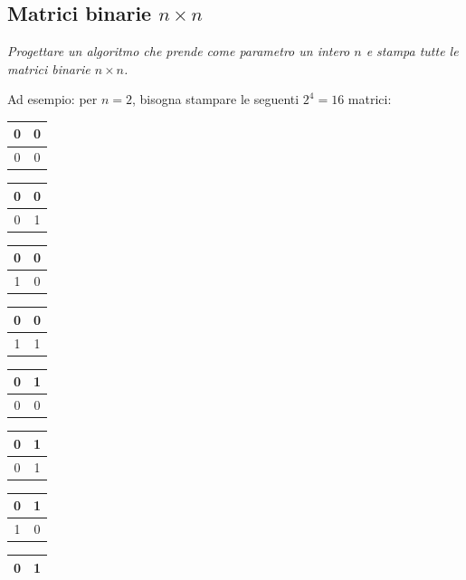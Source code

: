 \subsection{Matrici binarie $n\times n$}
\textit{Progettare un algoritmo che prende come parametro un intero $n$ e stampa tutte le matrici binarie $n\times n$.}

Ad esempio: per $n = 2$, bisogna stampare le seguenti $2^4 = 16$ matrici:
\begin{center}
\begin{tabular}{|c|c|}\hline
     0&0\\\hline
     0&0\\\hline
\end{tabular}\hspace{0.5cm}
\begin{tabular}{|c|c|}\hline
     0&0\\\hline
     0&1\\\hline
\end{tabular}\hspace{0.5cm}
\begin{tabular}{|c|c|}\hline
     0&0\\\hline
     1&0\\\hline
\end{tabular}\hspace{0.5cm}
\begin{tabular}{|c|c|}\hline
     0&0\\\hline
     1&1\\\hline
\end{tabular}\hspace{0.5cm}
\begin{tabular}{|c|c|}\hline
     0&1\\\hline
     0&0\\\hline
\end{tabular}\hspace{0.5cm}
\begin{tabular}{|c|c|}\hline
     0&1\\\hline
     0&1\\\hline
\end{tabular}\hspace{0.5cm}
\begin{tabular}{|c|c|}\hline
     0&1\\\hline
     1&0\\\hline
\end{tabular}\hspace{0.5cm}
\begin{tabular}{|c|c|}\hline
     0&1\\\hline

\end{tabular}
\end{center}
